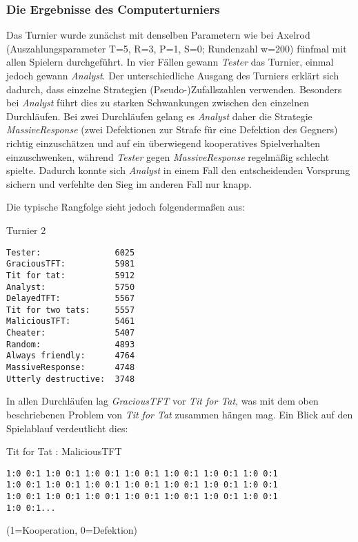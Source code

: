 \documentclass[12pt,a4paper,ngerman]{article}
\begin{document}
\subsubsection{Die Ergebnisse des Computerturniers}

Das Turnier wurde zunächst mit denselben Parametern wie bei Axelrod
(Auszahlungsparameter T=5, R=3, P=1, S=0; Rundenzahl w=200) fünfmal
mit allen Spielern durchgeführt. In vier Fällen gewann {\em Tester}
das Turnier, einmal jedoch gewann {\em Analyst}. Der unterschiedliche
Ausgang des Turniers erklärt sich dadurch, dass einzelne Strategien
(Pseudo-)Zufallszahlen verwenden. Besonders bei {\em Analyst} führt
dies zu starken Schwankungen zwischen den einzelnen Durchläufen. Bei
zwei Durchläufen gelang es {\em Analyst} daher die Strategie {\em
MassiveResponse} (zwei Defektionen zur Strafe für eine Defektion des
Gegners) richtig einzuschätzen und auf ein überwiegend kooperatives
Spielverhalten einzuschwenken, während {\em Tester} gegen {\em
MassiveResponse} regelmäßig schlecht spielte. Dadurch konnte sich {\em
Analyst} in einem Fall den entscheidenden Vorsprung sichern und
verfehlte den Sieg im anderen Fall nur knapp.

Die typische Rangfolge sieht jedoch folgendermaßen aus:

\begin{scriptsize}
\begin{samepage}
\begin{center}Turnier 2\end{center}
\begin{verbatim}
Tester:               6025
GraciousTFT:          5981
Tit for tat:          5912
Analyst:              5750
DelayedTFT:           5567
Tit for two tats:     5557
MaliciousTFT:         5461
Cheater:              5407
Random:               4893
Always friendly:      4764
MassiveResponse:      4748
Utterly destructive:  3748
\end{verbatim}
\end{samepage}
\end{scriptsize}

In allen Durchläufen lag {\em GraciousTFT} vor {\em Tit for Tat}, was mit dem
oben beschriebenen Problem von {\em Tit for Tat} zusammen hängen mag. Ein
Blick auf den Spielablauf verdeutlicht dies:

\begin{scriptsize}
\begin{center}Tit for Tat : MaliciousTFT\end{center}
\begin{verbatim}
1:0 0:1 1:0 0:1 1:0 0:1 1:0 0:1 1:0 0:1 1:0 0:1 1:0 0:1 
1:0 0:1 1:0 0:1 1:0 0:1 1:0 0:1 1:0 0:1 1:0 0:1 1:0 0:1 
1:0 0:1 1:0 0:1 1:0 0:1 1:0 0:1 1:0 0:1 1:0 0:1 1:0 0:1 
1:0 0:1...
\end{verbatim}
\begin{center}(1=Kooperation, 0=Defektion)\end{center}
\end{scriptsize}
\end{document}
